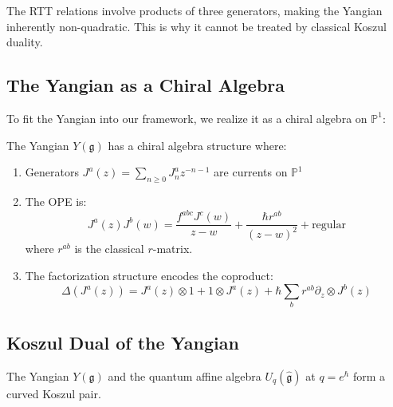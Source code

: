 \begin{remark}
The RTT relations involve products of three generators, making the Yangian inherently non-quadratic. This is why it cannot be treated by classical Koszul duality.
\end{remark}

\subsection{The Yangian as a Chiral Algebra}

To fit the Yangian into our framework, we realize it as a chiral algebra on $\mathbb{P}^1$:

\begin{theorem}
The Yangian $Y(\mathfrak{g})$ has a chiral algebra structure where:
\begin{enumerate}
\item Generators $J^a(z) = \sum_{n \geq 0} J_n^a z^{-n-1}$ are currents on $\mathbb{P}^1$

\item The OPE is:
$$J^a(z)J^b(w) = \frac{f^{abc}J^c(w)}{z-w} + \frac{\hbar r^{ab}}{(z-w)^2} + \text{regular}$$
where $r^{ab}$ is the classical $r$-matrix.

\item The factorization structure encodes the coproduct:
$$\Delta(J^a(z)) = J^a(z) \otimes 1 + 1 \otimes J^a(z) + \hbar\sum_b r^{ab} \partial_z \otimes J^b(z)$$
\end{enumerate}
\end{theorem}

\subsection{Koszul Dual of the Yangian}

\begin{theorem}
The Yangian $Y(\mathfrak{g})$ and the quantum affine algebra $U_q(\hat{\mathfrak{g}})$ at $q = e^{\hbar}$ form a curved Koszul pair.
\end{theorem}

